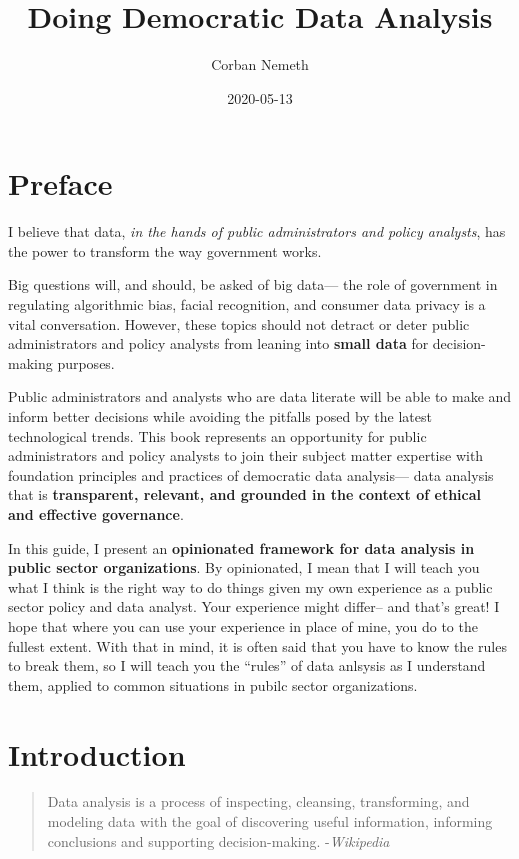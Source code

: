 \documentclass[]{book}
\title{Doing Democratic Data Analysis}
\author{Corban Nemeth}
\date{2020-05-13}
\begin{document}
\maketitle

{
\setcounter{tocdepth}{1}
\tableofcontents
}
\hypertarget{preface}{%
\chapter*{Preface}\label{preface}}

I believe that data, \emph{in the hands of public administrators and policy analysts}, has the power to transform the way government works.

Big questions will, and should, be asked of big data--- the role of government in regulating algorithmic bias, facial recognition, and consumer data privacy is a vital conversation. However, these topics should not detract or deter public administrators and policy analysts from leaning into \textbf{small data} for decision-making purposes.

Public administrators and analysts who are data literate will be able to make and inform better decisions while avoiding the pitfalls posed by the latest technological trends. This book represents an opportunity for public administrators and policy analysts to join their subject matter expertise with foundation principles and practices of democratic data analysis--- data analysis that is \textbf{transparent, relevant, and grounded in the context of ethical and effective governance}.

In this guide, I present an \textbf{opinionated framework for data analysis in public sector organizations}. By opinionated, I mean that I will teach you what I think is the right way to do things given my own experience as a public sector policy and data analyst. Your experience might differ-- and that's great! I hope that where you can use your experience in place of mine, you do to the fullest extent. With that in mind, it is often said that you have to know the rules to break them, so I will teach you the ``rules'' of data anlsysis as I understand them, applied to common situations in pubilc sector organizations.

\hypertarget{intro}{%
\chapter{Introduction}\label{intro}}

\begin{quote}
Data analysis is a process of inspecting, cleansing, transforming, and modeling data with the goal of discovering useful information, informing conclusions and supporting decision-making. -\emph{Wikipedia}
\end{quote}
\end{document}
